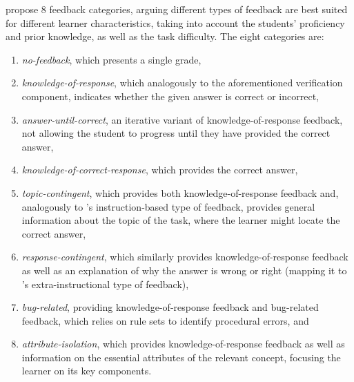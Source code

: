 \citet{mason_providing_2001} propose 8 feedback categories, arguing different types of feedback are best suited for different learner characteristics, taking into account the students' proficiency and prior knowledge, as well as the task difficulty.
The eight categories are:
\begin{enumerate}[itemsep=0.05em,label=(\roman*)]
    \item \textit{no-feedback}, which presents a single grade, 
    \item \textit{knowledge-of-response}, which analogously to the aforementioned verification component, indicates whether the given answer is correct or incorrect, 
    \item \textit{answer-until-correct}, an iterative variant of knowledge-of-response feedback, not allowing the student to progress until they have provided the correct answer, 
    \item \textit{knowledge-of-correct-response}, which provides the correct answer, 
    \item \textit{topic-contingent}, which provides both knowledge-of-response feedback and, analogously to \citet{kulhavy_feedback_1989}'s instruction-based type of feedback, provides general information about the topic of the task, where the learner might locate the correct answer, 
    \item \textit{response-contingent}, which similarly provides knowledge-of-response feedback as well as an explanation of why the answer is wrong or right (mapping it to \citet{kulhavy_feedback_1989}'s extra-instructional type of feedback), 
    \item \textit{bug-related}, providing knowledge-of-response feedback and bug-related feedback, which relies on rule sets to identify procedural errors, and
    \item \textit{attribute-isolation}, which provides knowledge-of-response feedback as well as information on the essential attributes of the relevant concept, focusing the learner on its key components.
\end{enumerate}

